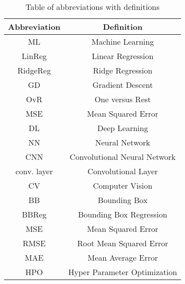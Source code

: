 \pagebreak

\begin{table}
    \centering
    \begin{tabular}{|c|c|}
        \hline
        Abbreviation & Definition \\
        \hline
        ML & Machine Learning \\
        \hline
        LinReg & Linear Regression \\
        \hline
        RidgeReg & Ridge Regression \\
        \hline
        GD & Gradient Descent \\
        \hline
        OvR & One versus Rest\\
        \hline
        MSE & Mean Squared Error \\
        \hline
        DL & Deep Learning \\
        \hline
        NN & Neural Network \\
        \hline
        CNN & Convolutional Neural Network \\
        \hline
        conv. layer & Convolutional Layer \\
        \hline
        CV & Computer Vision\\
        \hline
        BB & Bounding Box\\
        \hline
        BBReg & Bounding Box Regression\\
        \hline
        MSE & Mean Squared Error \\
        \hline
        RMSE & Root Mean Squared Error \\
        \hline
        MAE & Mean Average Error \\
        \hline
        HPO & Hyper Parameter Optimization \\
        \hline
    \end{tabular}
    \caption{Table of abbreviations with definitions}
    \label{fig:abbreviations}
\end{table}
